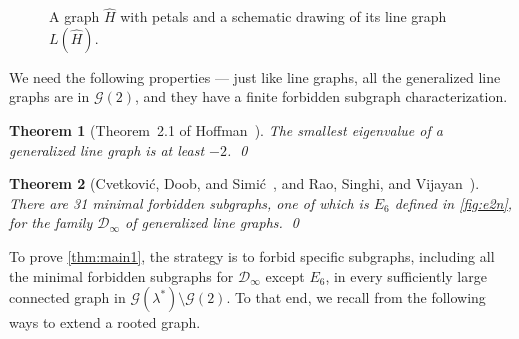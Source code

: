 \documentclass[11pt]{article}
\newtheorem{theorem}{Theorem}[section]
\theoremstyle{definition}
\theoremstyle{remark}
\newcommand{\las}{\lambda^*}
\newcommand{\D}{\mathcal{D}}
\newcommand{\G}{\mathcal{G}}
\begin{document}
\begin{figure}
    \caption{A graph $\hat{H}$ with petals and a schematic drawing of its line graph $L(\hat{H})$.} \label{fig:generalized-line-graph}
\end{figure}

We need the following properties --- just like line graphs, all the generalized line graphs are in $\G(2)$, and they have a finite forbidden subgraph characterization.

\begin{theorem}[Theorem~2.1 of Hoffman~\cite{H77b}] \label{thm:generalized-line-smallest-ev}
    The smallest eigenvalue of a generalized line graph is at least $-2$. \qed
\end{theorem}

\begin{theorem}[Cvetkovi\'{c}, Doob, and Simi\'{c}~\cite{CDS80,CDS81}, and Rao, Singhi, and Vijayan~\cite{RSV81}] \label{thm:forb-char-generalized-line}
    There are 31 minimal forbidden subgraphs, one of which is $E_6$ defined in \cref{fig:e2n}, for the family $\D_\infty$ of generalized line graphs. \qed
\end{theorem}

To prove \cref{thm:main1}, the strategy is to forbid specific subgraphs, including all the minimal forbidden subgraphs for $\D_\infty$ except $E_6$, in every sufficiently large connected graph in $\G(\las)\setminus\G(2)$. To that end, we recall from \cite{JP25} the following ways to extend a rooted graph.
\end{document}

